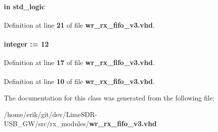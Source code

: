 \paragraph[{reset\+\_\+n}]{ {\bfseries \textcolor{keywordflow}{in}\textcolor{vhdlchar}{ }} {\bfseries \textcolor{comment}{std\+\_\+logic}\textcolor{vhdlchar}{ }} \hspace{0.3cm}{\ttfamily [Port]}}\label{classwr__rx__fifo__v3_a446ea52ed8c4a84181a47d9165ce41a5}


Definition at line {\bf 21} of file {\bf wr\+\_\+rx\+\_\+fifo\+\_\+v3.\+vhd}.

\paragraph[{sample\+\_\+wdth}]{ {\bfseries \textcolor{vhdlchar}{ }} {\bfseries \textcolor{comment}{integer}\textcolor{vhdlchar}{ }\textcolor{vhdlchar}{ }\textcolor{vhdlchar}{\+:}\textcolor{vhdlchar}{=}\textcolor{vhdlchar}{ }\textcolor{vhdlchar}{ } \textcolor{vhdldigit}{12} \textcolor{vhdlchar}{ }} \hspace{0.3cm}{\ttfamily [Generic]}}\label{classwr__rx__fifo__v3_acefb9139c73c3415d9f58adac9027cf3}


Definition at line {\bf 17} of file {\bf wr\+\_\+rx\+\_\+fifo\+\_\+v3.\+vhd}.

\paragraph[{std\+\_\+logic\+\_\+1164}]{\hspace{0.3cm}{\ttfamily [Package]}}\label{classwr__rx__fifo__v3_acd03516902501cd1c7296a98e22c6fcb}


Definition at line {\bf 10} of file {\bf wr\+\_\+rx\+\_\+fifo\+\_\+v3.\+vhd}.



The documentation for this class was generated from the following file\+:\begin{DoxyCompactItemize}
\item 
/home/erik/git/dev/\+Lime\+S\+D\+R-\/\+U\+S\+B\+\_\+\+G\+W/src/rx\+\_\+modules/{\bf wr\+\_\+rx\+\_\+fifo\+\_\+v3.\+vhd}\end{DoxyCompactItemize}
